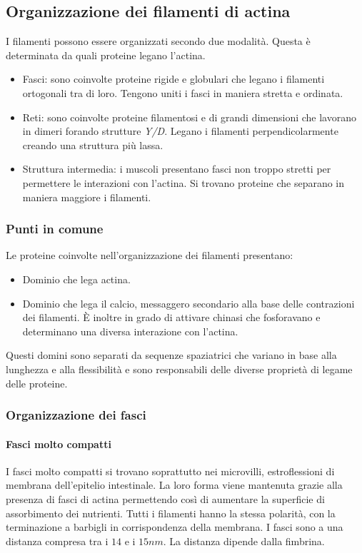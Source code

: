 	\subsection{Organizzazione dei filamenti di actina}
	I filamenti possono essere organizzati secondo due modalit\`a.
	Questa \`e determinata da quali proteine legano l'actina.
	\begin{multicols}{2}
		\begin{itemize}
			\item Fasci: sono coinvolte proteine rigide e globulari che legano i filamenti ortogonali tra di loro.
				Tengono uniti i fasci in maniera stretta e ordinata.
			\item Reti: sono coinvolte proteine filamentosi e di grandi dimensioni che lavorano in dimeri forando strutture \emph{Y/D}.
				Legano i filamenti perpendicolarmente creando una struttura pi\`u lassa.
			\item Struttura intermedia: i muscoli presentano fasci non troppo stretti per permettere le interazioni con l'actina.
				Si trovano proteine che separano in maniera maggiore i filamenti.
		\end{itemize}
	\end{multicols}

		\subsubsection{Punti in comune}
		Le proteine coinvolte nell'organizzazione dei filamenti presentano:
		\begin{multicols}{2}
			\begin{itemize}
				\item Dominio che lega actina.
				\item Dominio che lega il calcio, messaggero secondario alla base delle contrazioni dei filamenti.
					\`E inoltre in grado di attivare chinasi che fosforavano e determinano una diversa interazione con l'actina.
			\end{itemize}
		\end{multicols}
		Questi domini sono separati da sequenze spaziatrici che variano in base alla lunghezza e alla flessibilit\`a e sono responsabili delle diverse propriet\`a di legame delle proteine.

		\subsubsection{Organizzazione dei fasci}
		
			\paragraph{Fasci molto compatti}
			I fasci molto compatti si trovano soprattutto nei microvilli, estroflessioni di membrana dell'epitelio intestinale.
			La loro forma viene mantenuta grazie alla presenza di fasci di actina permettendo cos\`i di aumentare la superficie di assorbimento dei nutrienti.
			Tutti i filamenti hanno la stessa polarit\`a, con la terminazione a barbigli in corrispondenza della membrana.
			I fasci sono a una distanza compresa tra i $14$ e i $15nm$.
			La distanza dipende dalla fimbrina.

